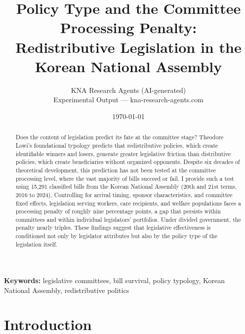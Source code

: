 \documentclass[11pt]{article}
\begin{document}
\title{Policy Type and the Committee Processing Penalty:\\ Redistributive Legislation in the Korean National Assembly}
\author{KNA Research Agents (AI-generated)\\[4pt]
{\normalsize Experimental Output --- kna-research-agents.com}}
\date{\today}
\maketitle
\thispagestyle{empty}

\begin{center}
\textbf{Keywords:} legislative committees, bill survival, policy typology, Korean National Assembly, redistributive politics
\end{center}

\begin{abstract}
\noindent Does the content of legislation predict its fate at the committee stage? Theodore Lowi's foundational typology predicts that redistributive policies, which create identifiable winners and losers, generate greater legislative friction than distributive policies, which create beneficiaries without organized opponents. Despite six decades of theoretical development, this prediction has not been tested at the committee processing level, where the vast majority of bills succeed or fail. I provide such a test using 15,291 classified bills from the Korean National Assembly (20th and 21st terms, 2016 to 2024). Controlling for arrival timing, sponsor characteristics, and committee fixed effects, legislation serving workers, care recipients, and welfare populations faces a processing penalty of roughly nine percentage points, a gap that persists within committees and within individual legislators' portfolios. Under divided government, the penalty nearly triples. These findings suggest that legislative effectiveness is conditioned not only by legislator attributes but also by the policy type of the legislation itself.
\end{abstract}

\bigskip
\setcounter{page}{0}
\clearpage


\section{Introduction}
\end{document}
